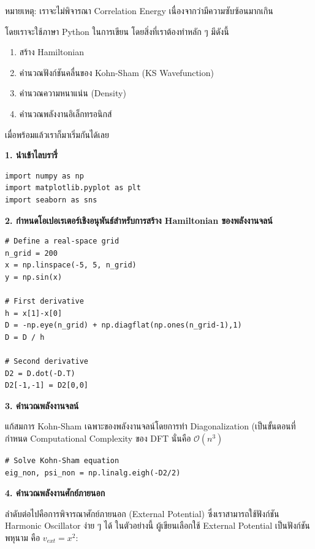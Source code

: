 \noindent หมายเหตุ: เราจะไม่พิจารณา Correlation Energy เนื่องจากว่ามีความซับซ้อนมากเกิน

โดยเราจะใช้ภาษา Python ในการเขียน โดยสิ่งที่เราต้องทำหลัก ๆ มีดังนี้

\begin{enumerate}[topsep=0pt,noitemsep]
    \item สร้าง Hamiltonian
    \item คำนวณฟังก์ชันคลื่นของ Kohn-Sham (KS Wavefunction)
    \item คำนวณความหนาแน่น (Density)
    \item คำนวณพลังงานอิเล็กทรอนิกส์
\end{enumerate}

\noindent เมื่อพร้อมแล้วเราก็มาเริ่มกันได้เลย

\noindent \textbf{1. นำเข้าไลบรารี่}

\begin{lstlisting}[style=MyPython]
import numpy as np
import matplotlib.pyplot as plt
import seaborn as sns
\end{lstlisting}

\vspace{1em}
\noindent \textbf{2. กำหนดโอเปอเรเตอร์เชิงอนุพันธ์สำหรับการสร้าง Hamiltonian ของพลังงานจลน์}

\begin{lstlisting}[style=MyPython]
# Define a real-space grid
n_grid = 200
x = np.linspace(-5, 5, n_grid)
y = np.sin(x)

# First derivative
h = x[1]-x[0]
D = -np.eye(n_grid) + np.diagflat(np.ones(n_grid-1),1)
D = D / h

# Second derivative
D2 = D.dot(-D.T)
D2[-1,-1] = D2[0,0]
\end{lstlisting}

\vspace{1em}
\noindent \textbf{3. คำนวณพลังงานจลน์}

แก้สมการ Kohn-Sham เฉพาะของพลังงานจลน์โดยการทำ Diagonalization (เป็นขั้นตอนที่กำหนด Computational Complexity ของ DFT 
นั่นคือ $\mathcal{O}(n^{3})$

\begin{lstlisting}[style=MyPython]
# Solve Kohn-Sham equation
eig_non, psi_non = np.linalg.eigh(-D2/2)
\end{lstlisting}

\vspace{1em}
\noindent \textbf{4. คำนวณพลังงานศักย์ภายนอก}

ลำดับต่อไปคือการพิจารณาศักย์ภายนอก (External Potential) ซึ่งเราสามารถใช้ฟังก์ชัน Harmonic Oscillator ง่าย ๆ ได้ ในตัวอย่างนี้%
ผู้เขียนเลือกใช้ External Potential เป็นฟังก์ชันพหุนาม คือ $v_{ext}=x^2$:

